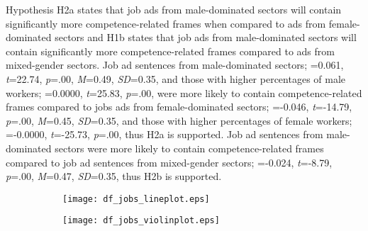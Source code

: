 \documentclass[man]{apa7}
\begin{document}
Hypothesis H2a states that job ads from male-dominated sectors will contain significantly more competence-related frames when compared to ads from female-dominated sectors and H1b states that job ads from male-dominated sectors will contain significantly more competence-related frames compared to ads from mixed-gender sectors. Job ad sentences from male-dominated sectors; \textit{\textbeta}=0.061, \textit{t}=22.74, \textit{p}=.00, \textit{M}=0.49, \textit{SD}=0.35, and those with higher percentages of male workers; \textit{\textbeta}=0.0000, \textit{t}=25.83, \textit{p}=.00, were more likely to contain competence-related frames compared to jobs ads from female-dominated sectors; \textit{\textbeta}=-0.046, \textit{t}=-14.79, \textit{p}=.00, \textit{M}=0.45, \textit{SD}=0.35, and those with higher percentages of female workers; \textit{\textbeta}=-0.0000, \textit{t}=-25.73, \textit{p}=.00, thus H2a is supported. Job ad sentences from male-dominated sectors were more likely to contain competence-related frames compared to job ad sentences from mixed-gender sectors; \textit{\textbeta}=-0.024, \textit{t}=-8.79, \textit{p}=.00, \textit{M}=0.47, \textit{SD}=0.35, thus H2b is supported.

\begin{figure}
    \caption{Classifier labeled dataset line and violin plots of warmth and competence probability distribution across categorical dominant social category of sector}
    \label{fig:df_jobs_anova}
    \centering
    \begin{subfigure}
        \centering
        \texttt{[image: df\_jobs\_lineplot.eps]}
    \end{subfigure}%
    \hfill
    \begin{subfigure}
        \centering
        \texttt{[image: df\_jobs\_violinplot.eps]}
    \end{subfigure}
    \raggedright{}
\end{figure}
\end{document}
